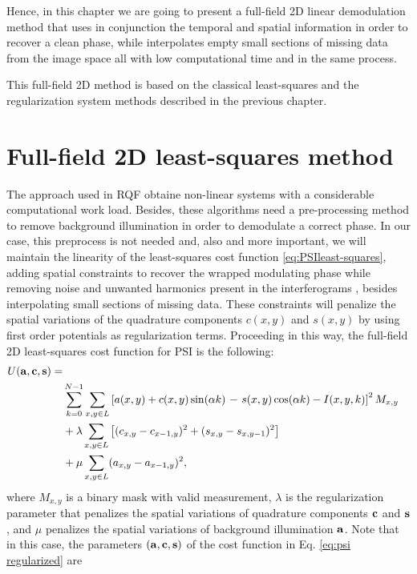 Hence, in this chapter we are going to present a full-field 2D linear demodulation
method that uses in conjunction the temporal and spatial information in order
to recover a clean phase, while interpolates empty small sections of missing
data from the image space all with low computational time and in the same
process.

This full-field 2D method is based on the classical least-squares and the 
regularization system methods described in the previous chapter.

\section{Full-field 2D least-squares method}

The approach used in RQF obtaine non-linear systems with a
considerable computational work load. Besides, these algorithms need a
pre-processing method to remove background illumination in order to
demodulate a correct phase. In our case, this preprocess is not needed and, also
and more important, we will maintain the linearity of the least-squares cost
function \eqref{eq:PSIleast-squares}, adding spatial constraints to recover the
wrapped modulating phase while removing noise and unwanted harmonics present in
the interferograms \cite{RQF}, besides interpolating small sections of missing
data. These constraints will penalize the spatial variations of the quadrature
components $c(x,y)$ and $s(x,y)$ by using first order potentials as
regularization terms. Proceeding in this way, the full-field 2D
least-squares cost function for PSI is the following:
\begin{align}
  U(\bf{a,c,s})=\nonumber\\
  &\sum_{k=0}^{N-1} \sum_{x,y\in L} \left[a(x,y) + 
  c(x,y)\sin(\alpha k)\right.
  -\left. s(x,y)\cos(\alpha k)-I(x,y,k) \right]^2 M_{x,y}\nonumber \\
  &+\lambda\sum_{x,y\in L}
  \left[(c_{x,y}-c_{x-1,y})^2+(s_{x,y}-s_{x,y-1})^2\right]
  \nonumber\\
  &+\mu\sum_{x,y\in L}(a_{x,y}-a_{x-1,y})^2,
  \label{eq:psi regularized}
\end{align}
where $M_{x,y}$ is a binary mask with valid measurement, $\lambda$ is the
regularization parameter that penalizes the spatial variations of quadrature
components $\bf c$ and $\bf s$, and $\mu$ penalizes the spatial variations of
background illumination $\bf a$. Note that in this case, the parameters
$(\bf{a,c,s})$ of the cost function in Eq. \eqref{eq:psi regularized} are
